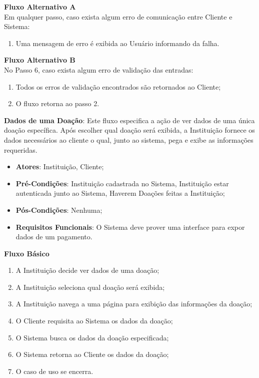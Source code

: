 \begin{anexosenv}
\begin{lista}
    \textbf{Fluxo Alternativo A} \\
    Em qualquer passo, caso exista algum erro de comunicação entre Cliente e Sistema:
    \begin{enumerate}
    \item Uma mensagem de erro é exibida ao Usuário informando da falha.
    \end{enumerate}
    
    \textbf{Fluxo Alternativo B} \\
    No Passo 6, caso exista algum erro de validação das entradas:
    \begin{enumerate}
    \item Todos os erros de validação encontrados são retornados ao Cliente;
    \item O fluxo retorna ao passo 2.
    \end{enumerate}
  
  
  
  \item \textbf{Dados de uma Doação}: Este fluxo especifica a ação de ver dados de uma única doação específica. Após escolher qual doação será exibida, a Instituição fornece os dados necessários ao cliente o qual, junto ao sistema, pega e exibe as informações requeridas.
    \begin{itemize}
    \item \textbf{Atores}: Instituição, Cliente;
    \item \textbf{Pré-Condições}: Instituição cadastrada no Sistema, Instituição estar autenticada junto ao Sistema, Haverem Doações feitas a Instituição;
    \item \textbf{Pós-Condições}: Nenhuma;
    \item \textbf{Requisitos Funcionais}: O Sistema deve prover uma interface para expor dados de um pagamento.
    \end{itemize}
	
    \textbf{Fluxo Básico}
    \begin{enumerate}
    \item A Instituição decide ver dados de uma doação;
    \item A Instituição seleciona qual doação será exibida;
    \item A Instituição navega a uma página para exibição das informações da doação;
    \item O Cliente requisita ao Sistema os dados da doação;
    \item O Sistema busca os dados da doação especificada;
    \item O Sistema retorna ao Cliente os dados da doação;
    \item O caso de uso se encerra.
    \end{enumerate}
    

\end{lista}
\end{anexosenv}
